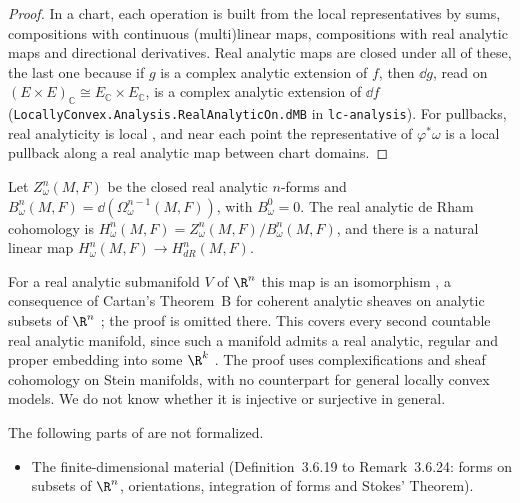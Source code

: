 \begin{proof}
  \leanok
  In a chart, each operation is built from the local representatives by sums, compositions with
  continuous (multi)linear maps, compositions with real analytic maps and directional
  derivatives. Real analytic maps are closed under all of these, the last one because if $g$ is a
  complex analytic extension of $f$, then $\dd g$, read on $(E \times E)_{\mathbb{C}} \cong
  E_{\mathbb{C}} \times E_{\mathbb{C}}$, is a complex analytic extension of $\dd f$
  (\texttt{LocallyConvex.Analysis.RealAnalyticOn.dMB} in \texttt{lc-analysis}). For pullbacks,
  real analyticity is local \cite[Lemma~2.2.3]{GN26}, and near each point the representative of
  $\varphi^*\omega$ is a local pullback along a real analytic map between chart domains.
\end{proof}

\begin{definition}
  \label{def:analytic-de-rham}
  \leanok
  Let $Z^n_\omega(M, F)$ be the closed real analytic $n$-forms and $B^n_\omega(M, F) =
  \dd(\Omega^{n-1}_\omega(M, F))$, with $B^0_\omega = 0$. The real analytic de Rham cohomology is
  $H^n_\omega(M, F) = Z^n_\omega(M, F)/B^n_\omega(M, F)$, and there is a natural linear map
  $H^n_\omega(M, F) \to H^n_{dR}(M, F)$.
\end{definition}

\begin{remark}
  For a real analytic submanifold $V$ of $\R^n$ this map is an isomorphism
  \cite[\S7, consequence~(4), p.~89]{Car57}, a consequence of Cartan's Theorem~B for coherent
  analytic sheaves on analytic subsets of $\R^n$ \cite[Theorem~3]{Car57}; the proof is omitted
  there. This covers every second countable real analytic manifold, since such a manifold admits a
  real analytic, regular and proper embedding into some $\R^k$ \cite[Theorem~3, p.~470]{Gra58}. The proof uses
  complexifications and sheaf cohomology on Stein manifolds, with no counterpart for general
  locally convex models. We do not know whether it is injective or surjective in general.
\end{remark}

\begin{remark}
  \label{rem:forms-not-covered}
  The following parts of \cite[Section~3.6]{GN26} are not formalized.
  \begin{itemize}
    \item The finite-dimensional material (Definition~3.6.19 to Remark~3.6.24: forms on subsets of
      $\R^n$, orientations, integration of forms and Stokes' Theorem).
  \end{itemize}
\end{remark}
